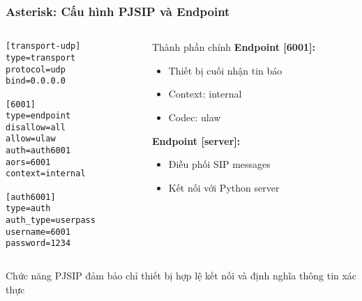\begin{frame}[fragile]
\frametitle{Asterisk: Cấu hình PJSIP và Endpoint}

\begin{columns}[t]
\begin{column}{0.55\textwidth}
\begin{verbatim}
[transport-udp]
type=transport
protocol=udp
bind=0.0.0.0

[6001]
type=endpoint
disallow=all
allow=ulaw
auth=auth6001
aors=6001
context=internal

[auth6001]
type=auth
auth_type=userpass
username=6001
password=1234
\end{verbatim}
\end{column}

\begin{column}{0.4\textwidth}
\begin{block}{Thành phần chính}
\textbf{Endpoint [6001]:}
\begin{itemize}
\item Thiết bị cuối nhận tin báo
\item Context: internal
\item Codec: ulaw
\end{itemize}

\textbf{Endpoint [server]:}
\begin{itemize}
\item Điều phối SIP messages
\item Kết nối với Python server
\end{itemize}
\end{block}
\end{column}
\end{columns}

\vspace{0.2cm}
\begin{alertblock}{Chức năng}
PJSIP đảm bảo chỉ thiết bị hợp lệ kết nối và định nghĩa thông tin xác thực
\end{alertblock}

\end{frame}

